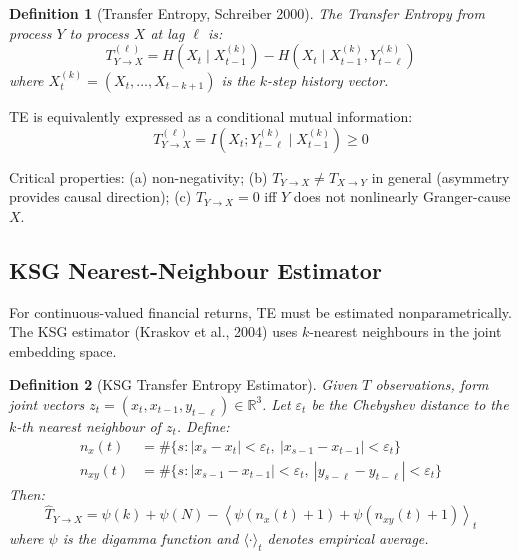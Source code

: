 \documentclass[11pt]{article}
\newtheorem{definition}{Definition}
\begin{document}
\begin{definition}[Transfer Entropy, Schreiber 2000]
The Transfer Entropy from process $Y$ to process $X$ at lag $\ell$ is:
\begin{equation}
T_{Y \to X}^{(\ell)} = H\left(X_t \mid X_{t-1}^{(k)}\right) - H\left(X_t \mid X_{t-1}^{(k)}, Y_{t-\ell}^{(k)}\right)
\label{eq:te-def}
\end{equation}
where $X_t^{(k)} = (X_t, \ldots, X_{t-k+1})$ is the $k$-step history vector.
\end{definition}

TE is equivalently expressed as a conditional mutual information:
\begin{equation}
T_{Y \to X}^{(\ell)} = I\left(X_t ; Y_{t-\ell}^{(k)} \mid X_{t-1}^{(k)}\right) \geq 0
\label{eq:te-cmi}
\end{equation}

Critical properties: (a) non-negativity; (b) $T_{Y\to X} \neq T_{X \to Y}$ in general (asymmetry provides causal direction); (c) $T_{Y \to X} = 0$ iff $Y$ does not nonlinearly Granger-cause $X$.

\subsection{KSG Nearest-Neighbour Estimator}

For continuous-valued financial returns, TE must be estimated nonparametrically. The KSG estimator (Kraskov et al., 2004) uses $k$-nearest neighbours in the joint embedding space.

\begin{definition}[KSG Transfer Entropy Estimator]
Given $T$ observations, form joint vectors $z_t = (x_t, x_{t-1}, y_{t-\ell}) \in \mathbb{R}^3$. Let $\varepsilon_t$ be the Chebyshev distance to the $k$-th nearest neighbour of $z_t$. Define:
\begin{align}
n_x(t) &= \#\{s : |x_s - x_t| < \varepsilon_t,\ |x_{s-1} - x_{t-1}| < \varepsilon_t\} \label{eq:nx} \\
n_{xy}(t) &= \#\{s : |x_{s-1} - x_{t-1}| < \varepsilon_t,\ |y_{s-\ell} - y_{t-\ell}| < \varepsilon_t\} \label{eq:nxy}
\end{align}
Then:
\begin{equation}
\hat{T}_{Y \to X} = \psi(k) + \psi(N) - \left\langle \psi(n_x(t)+1) + \psi(n_{xy}(t)+1) \right\rangle_t
\label{eq:ksg-te}
\end{equation}
where $\psi$ is the digamma function and $\langle \cdot \rangle_t$ denotes empirical average.
\end{definition}
\end{document}
